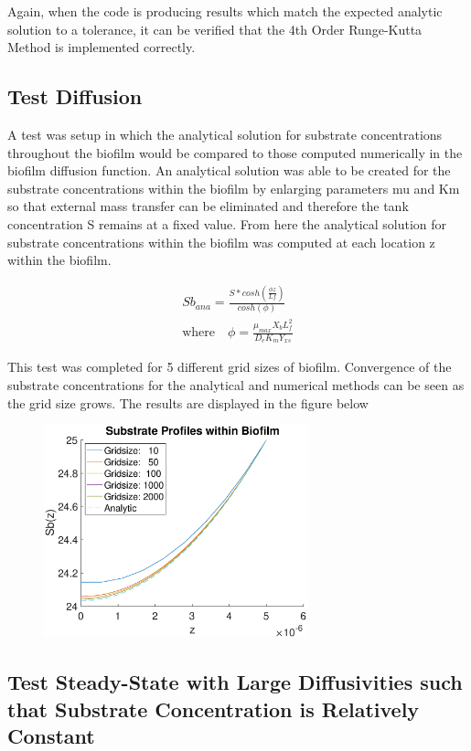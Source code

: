 \documentclass[letterpaper, twoside]{article}
\numberwithin{equation}{section}
\begin{document}
Again, when the code is producing results which match the expected analytic solution to a tolerance, it can be verified that the 4th Order Runge-Kutta Method is implemented correctly.

\subsection{Test Diffusion}
A test was setup in which the analytical solution for substrate concentrations throughout the biofilm would be compared to those computed numerically in the biofilm diffusion function. An analytical solution was able to be created for the substrate concentrations within the biofilm by enlarging parameters mu and Km so that external mass transfer can be eliminated and therefore the tank concentration S  remains at a fixed value. From here the analytical solution for substrate concentrations within the biofilm was computed at each location z within the biofilm.

\begin{align}
{Sb_{ana}}=\frac{S*{cosh(\frac{{\phi}{z}}{Lf})}}{cosh(\phi)}\\
\text{where}{\quad} {\phi}=\frac{\mu_{max}{X_b}{L_f^{2}}}{{D_e}{K_m}{Y_{xs}}}
\end{align}


This test was completed for 5 different grid sizes of biofilm. Convergence of the substrate concentrations for the analytical and numerical methods can be seen as the grid size grows. The results are displayed in the figure below

\begin{figure}[!ht]
  \centering
  \includegraphics[read=eps, width=3in]{BiofilmDiffusion_Figure1.eps}
\end{figure}

\subsection{Test Steady-State with Large Diffusivities such that Substrate Concentration is Relatively Constant}
\end{document}
